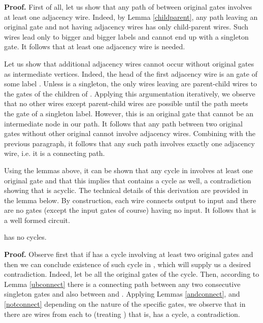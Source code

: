 \documentclass{llncs}
\begin{document}
{\bf Proof.}
First of all, let us show that any path of  between original gates involves at least one adjacency wire. 
Indeed, by Lemma \ref{childparent}, any path leaving an original gate and not having adjacency wires has only child-parent wires.
Such wires lead only to bigger and bigger labels and cannot end up with a singleton gate.
It follows that at least one adjacency wire is needed.

Let us show that additional adjacency wires cannot occur without original gates as intermediate vertices.
Indeed, the head of the first adjacency wire is an  gate of some label . Unless  is a singleton,
the only wires leaving  are parent-child wires to the  gates of the children of . Applying this
argumentation iteratively, we observe that no other wires except parent-child wires are possible until
the path meets the  gate of a singleton label. However, this is an original gate that cannot be 
an intermediate node in our path. It follows that any path between two original gates without other original 
cannot involve  adjacency wires. Combining with the previous paragraph, it follows that any such path
involves exactly one adjacency wire, i.e. it is a connecting path.
 

Using the lemmas above, it can be shown that any cycle in  involves at least one original
gate and that this implies that  contains a cycle as well, a contradiction showing that
 is acyclic. The technical details of this derivation are provided in the lemma below. 
By construction, each wire connects output to input 
and there are no gates (except the input gates of course) having no input.
It follows that  is a well formed circuit.


\begin{lemma} \label{nocycles}
 has no cycles.
\end{lemma} 

{\bf Proof.} Observe first that if  has a cycle involving at least two original gates  and 
then we can conclude existence of such cycle in , which will supply us a desired contradiction. 
Indeed, let  be all the original gates of the cycle. Then, according to Lemma \ref{ubconnect} there is a connecting path between any two consecutive singleton gates and also between  and . Applying Lemmas \ref{andconnect}, and
\ref{notconnect} depending on the nature of the specific gates, we observe that in  there are wires from each  to  (treating ) that is,  has a cycle, a contradiction.
\end{document}
